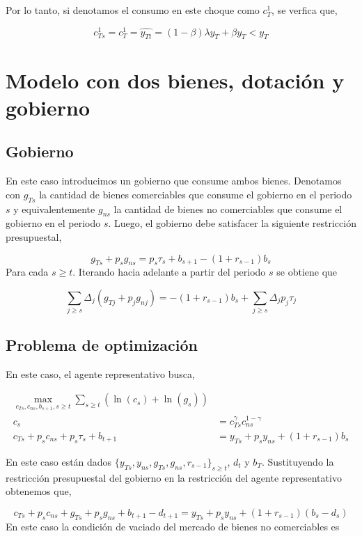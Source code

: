 \documentclass[]{article}
\begin{document}
Por lo tanto, si denotamos el consumo en este choque como \(c_T^1\), se
verfica que,

\[
c_{Ts}^1 = c_T^1 = \widehat{y_{Tt}} = (1-\beta)\lambda y_T + \beta y_T < y_T
\]

\section{Modelo con dos bienes, dotación y
gobierno}\label{modelo-con-dos-bienes-dotacion-y-gobierno}

\subsection{Gobierno}\label{gobierno-1}

En este caso introducimos un gobierno que consume ambos bienes.
Denotamos con \(g_{Ts}\) la cantidad de bienes comerciables que consume
el gobierno en el periodo \(s\) y equivalentemente \(g_{ns}\) la
cantidad de bienes no comerciables que consume el gobierno en el periodo
\(s\). Luego, el gobierno debe satisfacer la siguiente restricción
presupuestal,

\[
g_{Ts} + p_s g_{ns} = p_s \tau_s + b_{s+1} - (1 + r_{s-1})b_s
\] Para cada \(s \geq t\). Iterando hacia adelante a partir del periodo
\(s\) se obtiene que

\[
\sum_{j\geq s} \Delta_j (g_{Tj}+p_jg_{nj}) = -(1+r_{s-1})b_s + \sum_{j \geq s} \Delta_j p_j \tau_j
\]

\subsection{Problema de optimización}\label{problema-de-optimizacion-5}

En este caso, el agente representativo busca,

\[
\begin{align}
\max_{c_{Ts}, c_{ns}, b_{s+1}, s\geq t}  \sum_{s\geq t}(\ln(c_s) + \ln(g_s)) \\
 c_s &= c_{Ts}^\gamma c_{ns}^{1-\gamma} \\
c_{Ts} + p_sc_{ns} + p_s \tau_s + b_{t+1} &= y_{Ts} + p_sy_{ns} + (1 + r_{s-1})b_s
\end{align}
\]

En este caso están dados
\(\{y_{Ts}, y_{ns}, g_{Ts}, g_{ns}, r_{s-1}\}_{s\geq t}\), \(d_t\) y
\(b_T\). Sustituyendo la restricción presupuestal del gobierno en la
restricción del agente representativo obtenemos que,

\[
c_{Ts} + p_s c_{ns} + g_{Ts} + p_s g_{ns}+b_{t+1}-d_{t+1} = y_{Ts} + p_sy_{ns}+(1+r_{s-1})(b_s-d_s)
\] En este caso la condición de vaciado del mercado de bienes no
comerciables es
\end{document}
